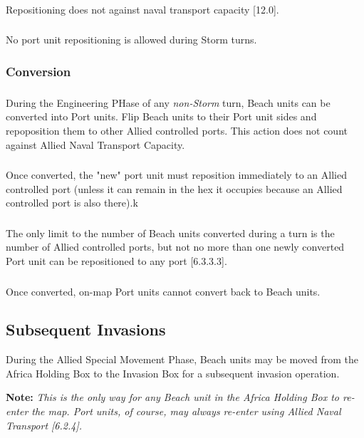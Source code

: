 \subsubsection{}
Repositioning does not against naval transport capacity [12.0].

\subsubsection{}
No port unit repositioning is allowed during Storm turns.

\subsubsection{Conversion}

\subsubsection{}
During the Engineering PHase of any \textit{non-Storm} turn, Beach units can be converted into Port units. Flip Beach units to their Port unit sides and repoposition them to other Allied controlled ports. This action does not count against Allied Naval Transport Capacity.

\subsubsection{}
Once converted, the "new" port unit must reposition immediately to an Allied controlled port (unless it can remain in the hex it occupies because an Allied controlled port is also there).k

\subsubsection{}
The only limit to the number of Beach units converted during a turn is the number of Allied controlled ports, but not no more than one newly converted Port unit can be repositioned to any port [6.3.3.3].

\subsubsection{}
Once converted, on-map Port units cannot convert back to Beach units.

\subsection{Subsequent Invasions}
During the Allied Special Movement Phase, Beach units may be moved from the Africa Holding Box to the Invasion Box for a subsequent invasion operation.

\textbf{Note:} \textit{This is the only way for any Beach unit in the Africa Holding Box to re-enter the map. Port units, of course, may always re-enter using Allied Naval Transport [6.2.4].}